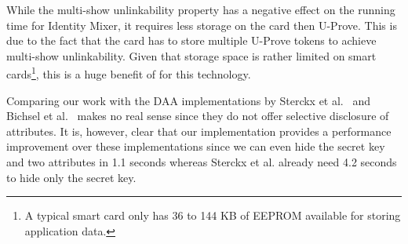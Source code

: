 While the multi-show unlinkability property has a negative effect on the running
time for Identity Mixer, it requires less storage on the card then U-Prove. This
is due to the fact that the card has to store multiple U-Prove tokens to achieve
multi-show unlinkability. Given that storage space is rather limited on smart
cards\footnote{A typical smart card only has 36 to 144 KB of EEPROM available
for storing application data.}, this is a huge benefit of for this technology.

Comparing our work with the DAA implementations by Sterckx et
al.~\cite{Sterckx09} and Bichsel et al.~\cite{BichselCGS2009} makes no real
sense since they do not offer selective disclosure of attributes. It is,
however, clear that our implementation provides a performance improvement over
these implementations since we can even hide the secret key and two attributes
in 1.1 seconds whereas Sterckx et al. already need 4.2 seconds to hide only the
secret key.